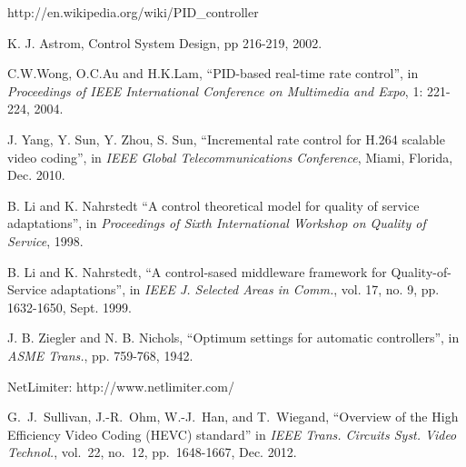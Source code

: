 \documentclass[journal]{IEEEtran}
\begin{document}
\begin{thebibliography}{1}
http://en.wikipedia.org/wiki/PID\_controller

K. J. Astrom, Control System Design, pp 216-219, 2002.

C.W.Wong, O.C.Au and H.K.Lam, ``PID-based real-time rate control'', in {\em Proceedings of IEEE International Conference on Multimedia and Expo}, 1: 221-224, 2004.

J. Yang, Y. Sun, Y. Zhou, S. Sun, ``Incremental rate control for H.264 scalable video coding'', in {\em IEEE Global Telecommunications Conference}, Miami, Florida, Dec. 2010.

B. Li and K. Nahrstedt  ``A control theoretical model for quality of service adaptations'', in {\em Proceedings of Sixth International Workshop on Quality of Service}, 1998.

B. Li and K. Nahrstedt, ``A control-sased middleware framework for Quality-of-Service adaptations'', in {\em IEEE J. Selected Areas in Comm.}, vol. 17, no. 9, pp. 1632-1650, Sept. 1999.

J. B. Ziegler and N. B. Nichols, ``Optimum settings for automatic controllers'', in {\em ASME Trans.}, pp. 759-768, 1942.

NetLimiter: http://www.netlimiter.com/

G.~J.~Sullivan, J.-R.~Ohm, W.-J.~Han, and T.~Wiegand, ``Overview of the High Efficiency Video Coding (HEVC) standard'' in {\em IEEE Trans. Circuits Syst. Video Technol.}, vol.~22, no.~12, pp.~1648-1667, Dec. 2012. 

\end{thebibliography}

\balance

\end{document}
